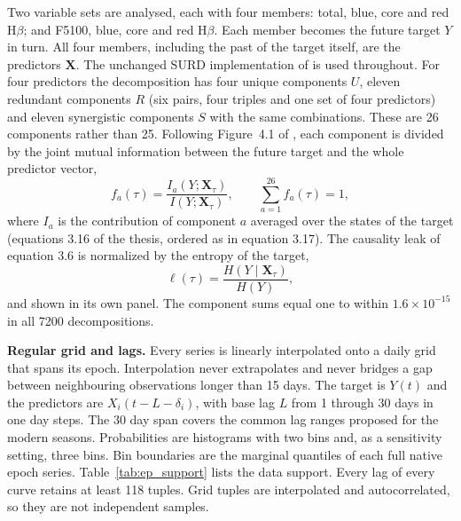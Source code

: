 \documentclass[fleqn,usenatbib]{mnras}
\begin{document}
Two variable sets are analysed, each with four members: total, blue, core and
red H$\beta$; and F5100, blue, core and red H$\beta$. Each member becomes the
future target $Y$ in turn. All four members, including the past of the target
itself, are the predictors $\mathbf{X}$. The unchanged SURD implementation of
\citet{MartinezSanchez2024SURD} is used throughout. For four predictors the decomposition has
four unique components $U$, eleven redundant components $R$ (six pairs, four
triples and one set of four predictors) and eleven synergistic components $S$
with the same combinations. These are 26 components rather than 25. Following
Figure~4.1 of \citet{MartinezSanchez2025Thesis}, each component is divided by the joint mutual
information between the future target and the whole predictor vector,
\begin{equation}
 f_a(\tau)=\frac{I_a(Y;\mathbf{X}_{\tau})}{I(Y;\mathbf{X}_{\tau})},
 \qquad \sum_{a=1}^{26}f_a(\tau)=1 ,
 \label{eq:ep_component_normalization}
\end{equation}
where $I_a$ is the contribution of component $a$ averaged over the states of the
target (equations 3.16 of the thesis, ordered as in equation 3.17). The causality
leak of equation 3.6 is normalized by the entropy of the target,
\begin{equation}
 \ell(\tau)=\frac{H(Y\mid\mathbf{X}_{\tau})}{H(Y)} ,
 \label{eq:ep_leakage}
\end{equation}
and shown in its own panel. The component sums equal one to within
$1.6\times10^{-15}$ in all 7200 decompositions.

\textbf{Regular grid and lags.} Every series is linearly interpolated onto a
daily grid that spans its epoch. Interpolation never extrapolates and never
bridges a gap between neighbouring observations longer than 15 days. The target
is $Y(t)$ and the predictors are $X_i(t-L-\delta_i)$, with base lag $L$ from 1
through 30 days in one day steps. The 30 day span covers the common lag ranges
proposed for the modern seasons. Probabilities are histograms with two bins and,
as a sensitivity setting, three bins. Bin boundaries are the marginal quantiles
of each full native epoch series. Table~\ref{tab:ep_support} lists the data
support. Every lag of every curve retains at least 118 tuples. Grid tuples are
interpolated and autocorrelated, so they are not independent samples.
\end{document}
